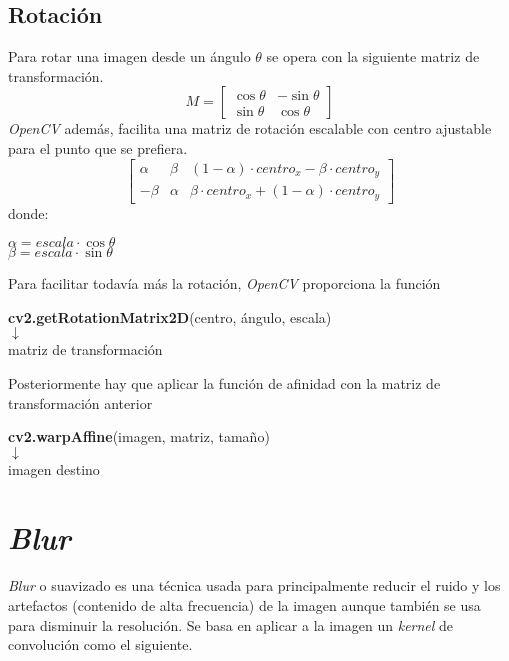 \subsection{Rotación}
Para rotar una imagen desde un ángulo $\theta$ se opera con la
siguiente matriz de transformación.
\begin{equation*}
  M =
  \begin{bmatrix}
    \cos \theta & -\sin \theta \\ \sin \theta & \cos \theta
  \end{bmatrix}
\end{equation*}
\emph{OpenCV} además, facilita una matriz de rotación escalable con
centro ajustable para el punto que se prefiera.
\begin{equation*}
  \begin{bmatrix}
    \alpha & \beta & (1 - \alpha) \cdot centro_x - \beta \cdot centro_y \\
    - \beta & \alpha & \beta \cdot centro_x + (1 - \alpha) \cdot
    centro_y
  \end{bmatrix}
\end{equation*}
donde:
\begin{center}
  $ \alpha = escala \cdot \cos \theta $
  \\
  $ \beta = escala \cdot \sin \theta $
\end{center}
Para facilitar todavía más la rotación, \emph{OpenCV} proporciona la
función
\begin{center}
  \textbf{cv2.getRotationMatrix2D}(centro, ángulo, escala) \\
  $\downarrow$ \\
  matriz de transformación
\end{center}
Posteriormente hay que aplicar la función de afinidad con la matriz de transformación anterior \\
\begin{center}
  \textbf{cv2.warpAffine}(imagen, matriz, tamaño)\\
  $\downarrow$ \\
  imagen destino
\end{center}

\section{\emph{Blur}}
\emph{Blur} o suavizado es una técnica usada para principalmente
reducir el ruido y los artefactos (contenido de alta frecuencia) de la
imagen aunque también se usa para disminuir la resolución. Se basa en
aplicar a la imagen un \emph{kernel} de convolución como el siguiente.
